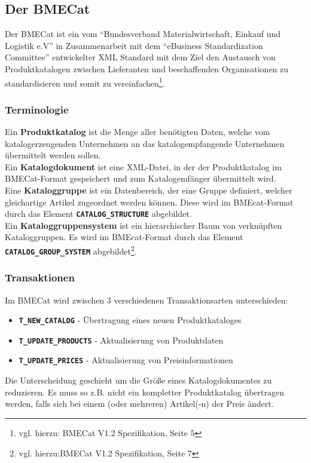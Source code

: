 	\subsection{Der BMECat} %
	
	Der BMECat ist ein vom \enquote{Bundesverband Materialwirtschaft, Einkauf und Logistik e.V} in Zusammenarbeit mit dem \enquote{eBusiness Standardization Committee} entwickelter XML
	Standard mit dem Ziel den Austausch von Produktkatalogen zwischen Lieferanten und beschaffenden Organisationen zu standardisieren und somit zu vereinfachen\footnote{vgl. hierzu: BMECat V1.2 Spezifikation, Seite 5}. 
	
	\subsubsection{Terminologie}
	Ein \textbf{Produktkatalog} ist die Menge aller benötigten Daten, welche vom katalogerzeugenden Unternehmen an das katalogempfangende Unternehmen übermittelt werden sollen.\\
	Ein \textbf{Katalogdokument} ist eine XML-Datei, in der der Produktkatalog im BMECat-Format gespeichert und zum Katalogemfänger übermittelt wird.\\
	Eine \textbf{Kataloggruppe} ist ein Datenbereich, der eine Gruppe definiert, welcher gleichartige Artikel zugeordnet werden können. Diese wird im BMEcat-Format durch das Element \texttt{\textbf{CATALOG\_STRUCTURE}} abgebildet.\\
	Ein \textbf{Kataloggruppensystem} ist ein hierarchischer Baum von verknüpften Kataloggruppen. Es wird
	im BMEcat-Format durch das Element \texttt{\textbf{CATALOG\_GROUP\_SYSTEM}} abgebildet\footnote{vgl. hierzu:BMECat V1.2 Spezifikation, Seite 7}.
	
	\subsubsection{Transaktionen}
	Im BMECat wird zwischen 3 verschiedenen Transaktionsarten unterschieden:
	\begin{itemize}[noitemsep]
	\item \texttt{\textbf{T\_NEW\_CATALOG}} - Übertragung eines neuen Produktkataloges
	\item \texttt{\textbf{T\_UPDATE\_PRODUCTS}} - Aktualisierung von Produktdaten
	\item \texttt{\textbf{T\_UPDATE\_PRICES}} - Aktualisierung von Preisinformationen
	\end{itemize} 
	Die Unterscheidung geschieht um die Größe eines Katalogdokumentes zu reduzieren. Es muss so z.B. nicht ein kompletter Produktkatalog übertragen werden, falls sich bei einem (oder mehreren) Artikel(-n) der Preis ändert. %
	
